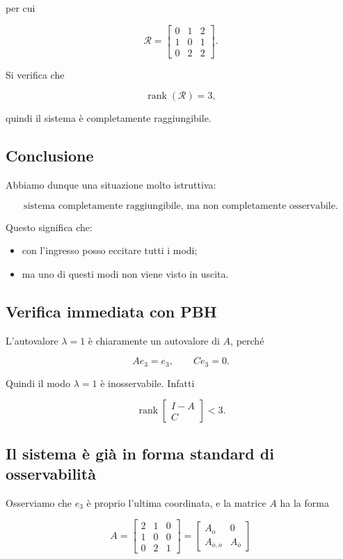 per cui

\[
\mathcal R=
\begin{bmatrix}
0 & 1 & 2\\
1 & 0 & 1\\
0 & 2 & 2
\end{bmatrix}.
\]

Si verifica che

\[
\operatorname{rank}(\mathcal R)=3,
\]

quindi il sistema è completamente raggiungibile.

\subsection{Conclusione}

Abbiamo dunque una situazione molto istruttiva:

\[
\text{sistema completamente raggiungibile, ma non completamente osservabile.}
\]

Questo significa che:
\begin{itemize}
    \item con l'ingresso posso eccitare tutti i modi;
    \item ma uno di questi modi non viene visto in uscita.
\end{itemize}

\subsection{Verifica immediata con PBH}

L'autovalore \(\lambda=1\) è chiaramente un autovalore di \(A\), perché

\[
Ae_3=e_3,
\qquad
Ce_3=0.
\]

Quindi il modo \(\lambda=1\) è inosservabile.  
Infatti

\[
\operatorname{rank}
\begin{bmatrix}
I-A\\
C
\end{bmatrix}
<3.
\]

\subsection{Il sistema è già in forma standard di osservabilità}

Osserviamo che \(e_3\) è proprio l'ultima coordinata, e la matrice \(A\) ha la forma

\[
A=
\begin{bmatrix}
2 & 1 & 0\\
1 & 0 & 0\\
0 & 2 & 1
\end{bmatrix}
=
\left[
\begin{array}{c|c}
A_o & 0\\
\hline
A_{\bar o,o} & A_{\bar o}
\end{array}
\right]
\]


